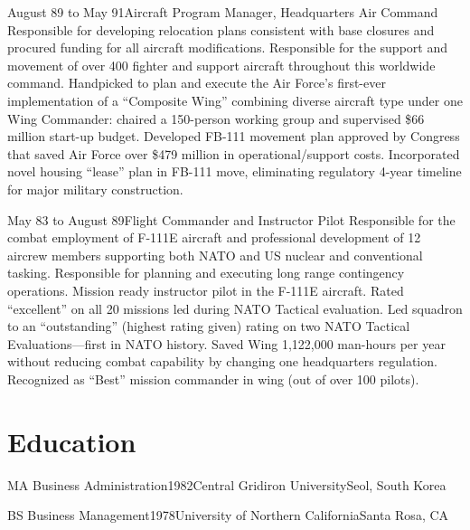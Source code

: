 \documentclass[9pt,letterpaper,times]{mtresume}
\begin{document}
\begin{job}{August 89 to May 91}{Aircraft Program Manager, Headquarters Air Command}{}{%
Responsible for developing relocation plans
consistent with base closures and procured funding for all aircraft modifications. Responsible for the support and movement of over
400 fighter and support aircraft throughout this worldwide command.
}
\accomplishment Handpicked to plan and execute the Air Force's first-ever implementation of a ``Composite Wing'' combining diverse aircraft type
under one Wing Commander: chaired a 150-person working group and supervised \$66 million start-up budget.
\accomplishment Developed FB-111 movement plan approved by Congress that saved Air Force over \$479 million in operational/support costs.
\accomplishment Incorporated novel housing ``lease'' plan in FB-111 move, eliminating regulatory 4-year timeline for major military construction.
\end{job}

\begin{job}{May 83 to August 89}{Flight Commander and Instructor Pilot}{}{%
Responsible for the combat employment of F-111E aircraft and
professional development of 12 aircrew members supporting both NATO and US nuclear and conventional tasking. Responsible for
planning and executing long range contingency operations. Mission ready instructor pilot in the F-111E aircraft.
}
\accomplishment Rated ``excellent'' on all 20 missions led during NATO Tactical evaluation.
\accomplishment Led squadron to an ``outstanding'' (highest rating given) rating on two NATO Tactical Evaluations---first in NATO history.
\accomplishment Saved Wing 1,122,000 man-hours per year without reducing combat capability by changing one headquarters regulation.
\accomplishment Recognized as ``Best'' mission commander in wing (out of over 100 pilots).
\end{job}


\section*{Education}

\begin{degree}{MA Business Administration}{1982}{Central Gridiron University}{Seol, South Korea}\end{degree}
\begin{degree}{BS Business Management}{1978}{University of Northern California}{Santa Rosa, CA}\end{degree}
\end{document}
